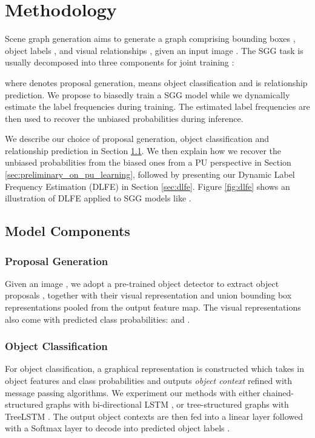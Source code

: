 \documentclass[sigconf]{acmart}
\begin{document}
\section{Methodology}

Scene graph generation aims to generate a graph  comprising bounding boxes , object labels , and visual relationships , given an input image .
The SGG task  is usually decomposed into three components for joint training \cite{zellers2018neural}:

where  denotes proposal generation,  means object classification and  is relationship prediction.
We propose to biasedly train a SGG model while we dynamically estimate the label frequencies during training.
The estimated label frequencies are then used to recover the unbiased probabilities during inference.

We describe our choice of proposal generation, object classification and relationship prediction in Section \ref{sec:model_components}.
We then explain how we recover the unbiased probabilities from the biased ones from a PU perspective in Section \ref{sec:preliminary_on_pu_learning}, followed by presenting our Dynamic Label Frequency Estimation (DLFE) in Section \ref{sec:dlfe}.
Figure \ref{fig:dlfe} shows an illustration of DLFE applied to SGG models like \cite{zellers2018neural,tang2019learning}.

\subsection{Model Components}
\label{sec:model_components}
\subsubsection{Proposal Generation }
Given an image , we adopt a pre-trained object detector \cite{ren2015faster} to extract  object proposals , together with their visual representation  and  union bounding box representations  pooled from the output feature map.
The visual representations also come with predicted class probabilities:  and .

\subsubsection{Object Classification }
For object classification, a graphical representation is constructed which takes in object features  and class probabilities  and outputs \textit{object context}  refined with message passing algorithms.
We experiment our methods with either chained-structured graphs \cite{zellers2018neural} with bi-directional LSTM \cite{hochreiter1997long}, or tree-structured graphs \cite{tang2019learning} with TreeLSTM \cite{tai-etal-2015-improved}.
The output object contexts are then fed into a linear layer followed with a Softmax layer to decode into predicted object labels .
\end{document}
